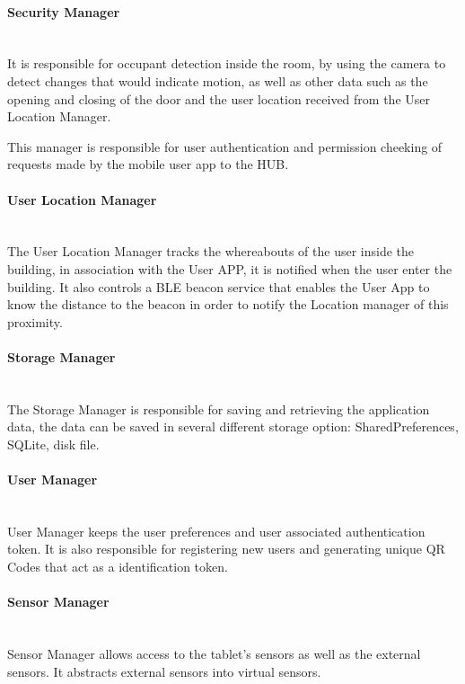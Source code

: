 \paragraph{Security Manager}\mbox{}\\
It is responsible for occupant detection inside the room, by using the camera to detect changes that would indicate motion, as well as other data such as the opening and closing of the door and the user location received from the User Location Manager.

This manager is responsible for user authentication and permission cheeking of requests made by the mobile user app to the HUB.


\paragraph{User Location Manager}\mbox{}\\
The User Location Manager tracks the whereabouts of the user inside the building, in association with the User APP, it is notified when the user enter the building. It also controls a BLE beacon service that enables the User App to know the distance to the beacon in order to notify the Location manager of this proximity.

\paragraph{Storage Manager}\mbox{}\\
The Storage Manager is responsible for saving and retrieving the application data, the data can be saved in several different storage option: SharedPreferences, SQLite, disk file.

\paragraph{User Manager}\mbox{}\\
User Manager keeps the user preferences and user associated authentication token. It is also responsible for registering new users and generating unique QR Codes that act as a identification token.

\paragraph{Sensor Manager}\mbox{}\\
Sensor Manager allows access to the tablet's sensors as well as the external sensors. It abstracts external sensors into virtual sensors.


